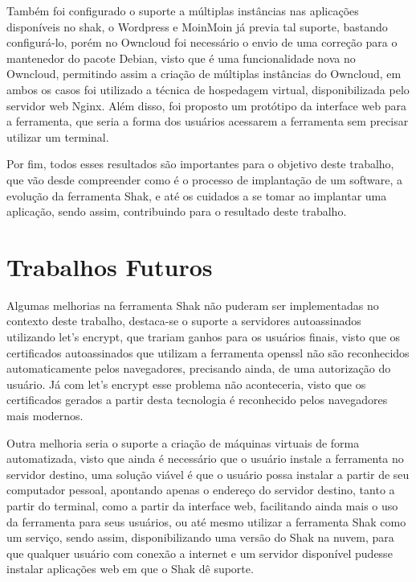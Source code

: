 Também foi configurado o suporte a múltiplas instâncias nas aplicações disponíveis
no shak, o Wordpress e MoinMoin já previa tal suporte, bastando configurá-lo, porém no Owncloud
foi necessário o envio de uma correção para o mantenedor do pacote Debian, visto que
é uma funcionalidade nova no Owncloud, permitindo assim a criação de múltiplas
instâncias do Owncloud, em ambos os casos foi utilizado a técnica de hospedagem
virtual, disponibilizada pelo servidor web Nginx. Além disso, foi proposto um protótipo
da interface web para a ferramenta, que seria a forma dos usuários acessarem a
ferramenta sem precisar utilizar um terminal.

Por fim, todos esses resultados são importantes para o objetivo deste trabalho, que vão
desde compreender como é o processo de implantação de um software, a evolução
da ferramenta Shak, e até os cuidados
a se tomar ao implantar uma aplicação, sendo assim, contribuindo para o resultado
deste trabalho.

\section{Trabalhos Futuros}
%
Algumas melhorias na ferramenta Shak não puderam ser implementadas  no contexto
deste trabalho, destaca-se o suporte a servidores autoassinados utilizando
let's encrypt, que trariam ganhos para os usuários finais, visto que os certificados
autoassinados que utilizam a ferramenta openssl não são reconhecidos automaticamente
pelos navegadores, precisando ainda, de uma autorização do usuário. Já
com let's encrypt esse problema não aconteceria, visto que os certificados
gerados a partir desta tecnologia é reconhecido pelos navegadores mais modernos.

Outra melhoria seria o suporte a criação de máquinas virtuais de forma automatizada, visto
que ainda é necessário que o usuário instale a ferramenta no servidor destino, uma
solução viável é que o usuário possa instalar a partir de seu computador pessoal,
 apontando apenas o endereço do servidor destino, tanto a partir do terminal, como
a partir da interface web, facilitando ainda mais o uso da ferramenta para seus usuários, ou
até mesmo utilizar a ferramenta Shak como um serviço, sendo assim, disponibilizando uma
versão do Shak na nuvem, para que qualquer usuário com conexão a internet e um servidor
disponível pudesse instalar aplicações web em que o Shak dê suporte.
